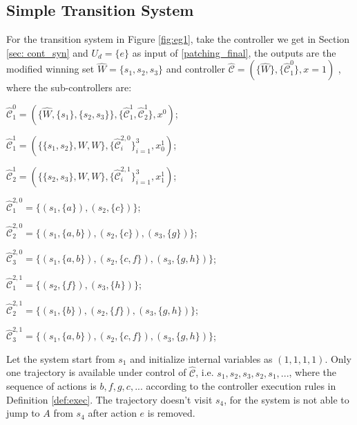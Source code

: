 \subsection{Simple Transition System}
For the transition system in Figure \ref{fig:eg1}, take the controller we get in Section \ref{sec: cont_syn} and  $ U_d= \{e\} $ as input of \eqref{patching_final}, the outputs are the modified winning set $ \widehat{W}=\{s_1,s_2,s_3\} $ and controller $ \widehat{\mathcal{C}} = (\{\widehat{W}\},\{\widehat{\mathcal{C}}_1^0\},x=1) $ , where the sub-controllers are: 

$ \widehat{\mathcal{C}}^0_1 = (\{\widehat{W},\{s_1\},\{s_2,s_3\}\},\{\widehat{\mathcal{C}}^1_1, \widehat{\mathcal{C}}^1_2\},x^0) $;

$ \widehat{\mathcal{C}}^1_1 = (\{\{s_1,s_2\},W,W\},\{\widehat{\mathcal{C}}^{2,0}_i\}_{i=1}^3, x^1_0)$;

$ \widehat{\mathcal{C}}^1_2 = (\{\{s_2,s_3\},W,W\},\{\widehat{\mathcal{C}}^{2,1}_i\}_{i=1}^{3}, x^1_1)$;

$ \widehat{\mathcal{C}}^{2,0}_1 = \{(s_1,\{a\}),(s_2,\{c\})\} $;

$ \widehat{\mathcal{C}}^{2,0}_2 = \{(s_1,\{a,b\}),(s_2,\{c\}),(s_3,\{g\})\} $;

$ \widehat{\mathcal{C}}^{2,0}_3 = \{(s_1,\{a,b\}),(s_2,\{c,f\}),(s_3,\{g,h\})\} $; 

$ \widehat{\mathcal{C}}^{2,1}_1 = \{(s_2,\{f\}),(s_3,\{h\})\} $;

$ \widehat{\mathcal{C}}^{2,1}_2 = \{(s_1,\{b\}),(s_2,\{f\}), (s_3,\{g,h\})\} $;

$ \widehat{\mathcal{C}}^{2,1}_3 = \{(s_1,\{a,b\}),(s_2,\{c,f\}),(s_3,\{g,h\})\} $;


Let the system start from $ s_1 $ and initialize internal variables as $ (1,1,1,1) $. Only one trajectory is available under control of $\widehat{\mathcal{C}} $, i.e. $ s_1,s_2,s_3,s_2,s_1,...$, where the sequence of actions is $ b,f,g,c,... $ according to the controller execution rules in Definition \ref{def:exec}. The trajectory doesn't visit $ s_4 $, for the system is not able to jump to $ A $ from $ s_4 $ after action $ e $ is removed.

